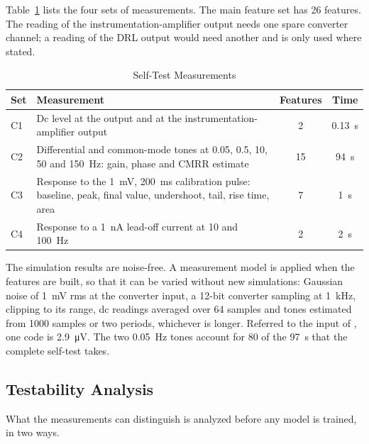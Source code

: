 Table~\ref{tab:measurements} lists the four sets of measurements. The main feature set has 26
features. The reading of the instrumentation-amplifier output needs one spare converter channel;
a reading of the DRL output would need another and is only used where stated.

\begin{table}[!t]
\caption{Self-Test Measurements}
\label{tab:measurements}
\centering
\setlength{\tabcolsep}{3pt}
\begin{tabular}{@{}lp{}cc@{}}
\toprule
Set & Measurement & Features & Time \\
\midrule
C1 & Dc level at the output and at the instrumentation-amplifier output & 2 & \SI{0.13}{\second} \\
C2 & Differential and common-mode tones at 0.05, 0.5, 10, 50 and \SI{150}{\hertz}: gain, phase and CMRR estimate & 15 & \SI{94}{\second} \\
C3 & Response to the \SI{1}{\milli\volt}, \SI{200}{\milli\second} calibration pulse: baseline, peak, final value, undershoot, tail, rise time, area & 7 & \SI{1}{\second} \\
C4 & Response to a \SI{1}{\nano\ampere} lead-off current at 10 and \SI{100}{\hertz} & 2 & \SI{2}{\second} \\
\bottomrule
\end{tabular}
\end{table}

The simulation results are noise-free. A measurement model is applied when the features are
built, so that it can be varied without new simulations: Gaussian noise of \SI{1}{\milli\volt}
rms at the converter input, a 12-bit converter sampling at \SI{1}{\kilo\hertz}, clipping to its
range, dc readings averaged over 64 samples and tones estimated from \num{1000} samples or two
periods, whichever is longer. Referred to the input of \cA, one code is \SI{2.9}{\micro\volt}. The
two \SI{0.05}{\hertz} tones account for 80 of the \SI{97}{\second} that the complete self-test
takes.

\subsection{Testability Analysis}
\label{sec:testability}

What the measurements can distinguish is analyzed before any model is trained, in two ways.

